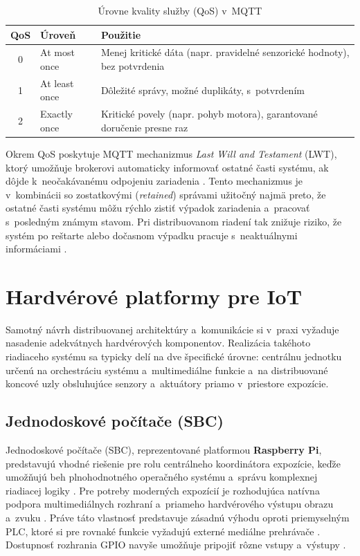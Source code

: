 \begin{table}[h]
\centering
\caption{Úrovne kvality služby (QoS) v~MQTT}
\label{tab:mqtt-qos}
\begin{tabular}{|c|l|p{7cm}|}
\hline
\textbf{QoS} & \textbf{Úroveň} & \textbf{Použitie} \\
\hline
0 & At most once & Menej kritické dáta (napr. pravidelné
    senzorické hodnoty), bez potvrdenia \\
\hline
1 & At least once & Dôležité správy, možné duplikáty,
    s~potvrdením \\
\hline
2 & Exactly once & Kritické povely (napr. pohyb motora),
    garantované doručenie presne raz \\
\hline
\end{tabular}
\end{table}

Okrem QoS poskytuje MQTT mechanizmus \textit{Last Will and
Testament} (LWT), ktorý umožňuje brokerovi automaticky informovať
ostatné časti systému, ak dôjde k~neočakávanému odpojeniu
zariadenia \cite{mqtt_lwt_review}. Tento mechanizmus je
v~kombinácii so zostatkovými (\textit{retained}) správami
užitočný najmä preto, že ostatné časti systému môžu rýchlo
zistiť výpadok zariadenia a~pracovať s~posledným známym stavom.
Pri distribuovanom riadení tak znižuje riziko, že systém po
reštarte alebo dočasnom výpadku pracuje s~neaktuálnymi
informáciami \cite{mqtt_lwt_review, mqtt_m2m_survey}.

\section{Hardvérové platformy pre IoT}
\label{hardverove-platformy}

Samotný návrh distribuovanej architektúry a~komunikácie si
v~praxi vyžaduje nasadenie adekvátnych hardvérových komponentov.
Realizácia takéhoto riadiaceho systému sa typicky delí na dve špecifické
úrovne: centrálnu jednotku určenú na orchestráciu systému a~multimediálne
funkcie a~na distribuované koncové uzly obsluhujúce senzory a~aktuátory priamo v~priestore expozície.

\subsection{Jednodoskové počítače (SBC)}
\label{sbc-platformy}

Jednodoskové počítače (SBC), reprezentované platformou
\textbf{Raspberry Pi}, predstavujú vhodné riešenie pre rolu
centrálneho koordinátora expozície, keďže umožňujú beh
plnohodnotného operačného systému a~správu komplexnej riadiacej
logiky \cite{rpi_esp32_scada}. Pre potreby moderných expozícií
je rozhodujúca natívna podpora multimediálnych rozhraní
a~priameho hardvérového výstupu obrazu a~zvuku
\cite{rpi4_datasheet}. Práve táto vlastnosť predstavuje zásadnú
výhodu oproti priemyselným PLC, ktoré si pre rovnaké funkcie
vyžadujú externé mediálne prehrávače \cite{huntington2017}.
Dostupnosť rozhrania GPIO navyše umožňuje pripojiť rôzne vstupy a~výstupy \cite{rpi4_datasheet}.

